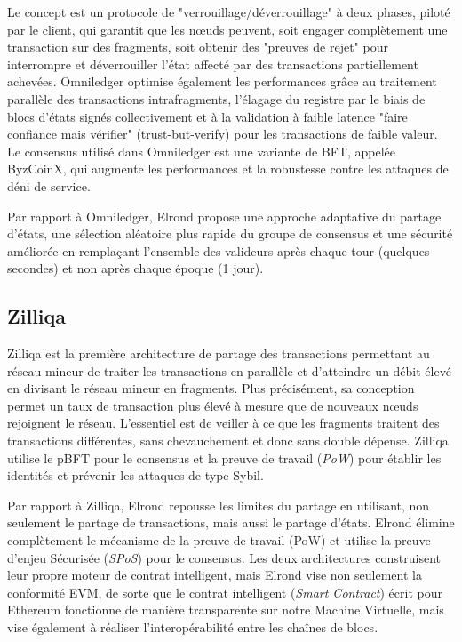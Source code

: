 \documentclass[journal]{IEEEtran}
\begin{document}
Le concept est un protocole de "verrouillage/déverrouillage" à deux phases, piloté par le client, qui garantit que les nœuds peuvent, soit engager complètement une transaction sur des fragments, soit obtenir des "preuves de rejet" pour interrompre et déverrouiller l'état affecté par des transactions partiellement achevées. Omniledger optimise également les performances grâce au traitement parallèle des transactions intrafragments,  l'élagage du  registre par le biais de blocs d'états signés collectivement et à la validation à faible latence "faire confiance mais vérifier" (trust-but-verify) pour les transactions de faible valeur. 
Le consensus utilisé dans Omniledger est une variante de BFT, appelée ByzCoinX, qui augmente les performances et la robustesse contre les attaques de déni de service.

Par rapport à Omniledger, Elrond propose une approche adaptative du partage d'états, une sélection aléatoire plus rapide du groupe de consensus et une sécurité améliorée en remplaçant l'ensemble des valideurs après chaque tour (quelques secondes) et non après chaque époque (1 jour).

\subsection{Zilliqa}
Zilliqa \cite{8} est la première architecture de partage des transactions permettant au réseau mineur de traiter les transactions en parallèle et d'atteindre un débit élevé en divisant le réseau mineur en fragments. Plus précisément, sa conception permet un taux de transaction plus élevé à mesure que de nouveaux nœuds rejoignent le réseau. L'essentiel est de veiller à ce que les fragments traitent des transactions différentes, sans chevauchement et donc sans double dépense. Zilliqa utilise le pBFT  \cite{15} pour le consensus et la preuve de travail (\textit{PoW}) pour établir les identités et prévenir les attaques de type Sybil.

Par rapport à Zilliqa, Elrond repousse les limites du partage en utilisant, non seulement le partage de transactions, mais aussi le partage d'états. Elrond élimine complètement le mécanisme de la preuve de travail (PoW) et utilise la preuve d’enjeu Sécurisée (\textit{SPoS}) pour le consensus. Les deux architectures construisent leur propre moteur de contrat intelligent, mais Elrond vise non seulement la conformité EVM, de sorte que le contrat intelligent (\textit{Smart Contract})  écrit pour Ethereum fonctionne de manière transparente sur notre Machine Virtuelle, mais vise également à réaliser l'interopérabilité entre les chaînes  de blocs.
\end{document}
